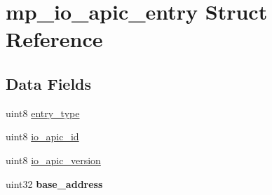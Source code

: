 \hypertarget{structmp__io__apic__entry}{
\section{mp\_\-io\_\-apic\_\-entry Struct Reference}
\label{structmp__io__apic__entry}
}
\subsection*{Data Fields}
\begin{DoxyCompactItemize}
\item 
uint8 \hyperlink{structmp__io__apic__entry_ac64269f891db779398dd61424aa4bb73}{entry\_\-type}
\item 
uint8 \hyperlink{structmp__io__apic__entry_a20afc2b098573c0f1bef76180503d8e2}{io\_\-apic\_\-id}
\item 
uint8 \hyperlink{structmp__io__apic__entry_a2b096510834abe7cdac8118c0f5a8c23}{io\_\-apic\_\-version}
\item 
\hypertarget{structmp__io__apic__entry_aa935a8bad95fe6caf314cf0f819a3658}{
uint32 {\bfseries base\_\-address}}
\label{structmp__io__apic__entry_aa935a8bad95fe6caf314cf0f819a3658}

\end{DoxyCompactItemize}


